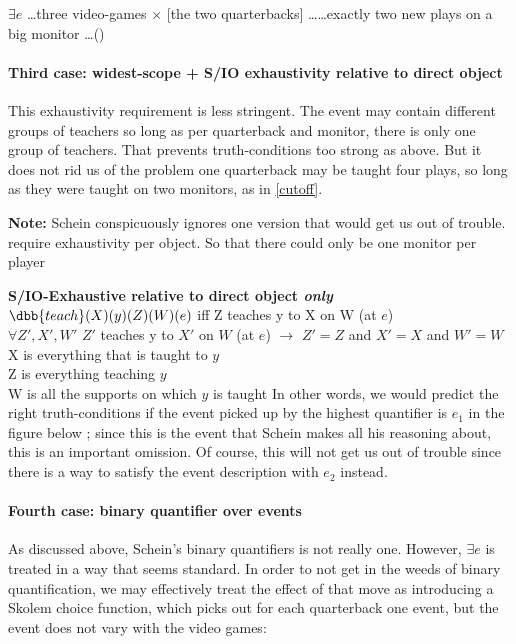 \documentclass[english]{article}
\newcommand{\scale}1
\begin{document}
\ex
$\exists e$ \ldots three video-games $\times$ [the two quarterbacks] \ldots  \ldots exactly two new plays on a big monitor \ldots ()

\xe
%


\paragraph{Third case: widest-scope + S/IO exhaustivity relative to direct object} This exhaustivity requirement is less stringent. The event may contain different groups of teachers so long as per quarterback and monitor, there is only one group of teachers. That prevents truth-conditions too strong as above. But it does not rid us of the problem one quarterback may be taught four plays, so long as they were taught on two monitors, as in \cref{cutoff}.

\textbf{Note:} Schein conspicuously ignores one version that would get us out of trouble. \cnextx require exhaustivity per object. So that there could only be one monitor per player

\pex \textbf{S/IO-Exhaustive relative to direct object \emph{only}}
\a 
$\dbb{teach}(X)(y)(Z)(W)(e)$ iff Z teaches y to X on W (at $e$)\\
$\forall Z', X', W'$ $Z'$ teaches y to $X'$ on $W$ (at $e$) $\rightarrow$ $Z'=Z$ and $X'=X$ and $W'=W$\\
\a 
X is everything that is taught to $y$\\
Z is everything teaching $y$\\
W is all the supports on which $y$ is taught
\xe
%
In other words, we would predict the right truth-conditions if the event picked up by the highest quantifier is $e_1$ in the figure below ; since this is the event that Schein makes all his reasoning about, this is an important omission. Of course, this will not get us out of trouble since there is a way to satisfy the event description with $e_2$ instead.

\ex
\renewcommand{\scale}{0.75}

\xe
%


\paragraph{Fourth case: binary quantifier over events} As discussed above, Schein's binary quantifiers is not really one. However, $\exists e$ is treated in a way that seems standard. In order to not get in the weeds of binary quantification, we may effectively treat the effect of that move as introducing a Skolem choice function, which picks out for each quarterback one event, but the event does not vary with the video games:
\end{document}
